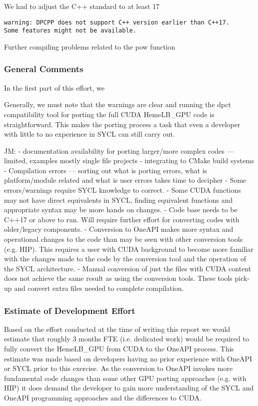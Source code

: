 \documentclass[../main]{subfiles}
\begin{document}
We had to adjust the C++ standard to at least 17
\begin{verbatim}
warning: DPCPP does not support C++ version earlier than C++17.
Some features might not be available.
\end{verbatim}

Further compiling problems related to the pow function

\subsubsection{General Comments}
In the first part of this effort, we

Generally, we must note that the warnings are clear and running the dpct compatibility tool for porting the full CUDA HemeLB\_GPU code is straightforward. This makes the porting process a task that even a developer with little to no experience in SYCL can still carry out.

JM:
- documentation availability for porting larger/more complex codes --- limited, examples mostly single file projects
- integrating to CMake build systems
- Compilation errors --- sorting out what is porting errors, what is platform/module related and what is user errors takes time to decipher
- Some errors/warnings require SYCL knowledge to correct.
- Some CUDA functions may not have direct equivalents in SYCL, finding equivalent functions and appropriate syntax may be more hands on changes.
- Code base needs to be C++17 or above to run. Will require further effort for converting codes with older/legacy components.
- Conversion to OneAPI makes more syntax and operational changes to the code than may be seen with other conversion tools (e.g. HIP). This requires a user with CUDA background to become more familiar with the changes made to the code by the conversion tool and the operation of the SYCL architecture.
- Manual conversion of just the files with CUDA content does not achieve the same result as using the conversion tools. These tools pick-up and convert extra files needed to complete compilation.

\subsubsection{Estimate of Development Effort}
Based on the effort conducted at the time of writing this report we would estimate that roughly 3 months FTE (i.e. dedicated work) would be required to fully convert the HemeLB\_GPU from CUDA to the OneAPI process.
This estimate was made based on developers having no prior experience with OneAPI or SYCL prior to this exercise.
As the conversion to OneAPI invokes more fundamental code changes than some other GPU porting approaches (e.g. with HIP) it does demand the developer to gain more understanding of the SYCL and OneAPI programming approaches and the differences to CUDA.
\end{document}
